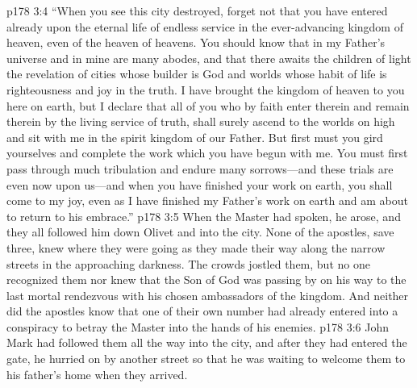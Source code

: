 \vs p178 3:4 \textcolor{ubdarkred}{“When you see this city destroyed, forget not that you have entered already upon the eternal life of endless service in the ever\hyp{}advancing kingdom of heaven, even of the heaven of heavens. You should know that in my Father’s universe and in mine are many abodes, and that there awaits the children of light the revelation of cities whose builder is God and worlds whose habit of life is righteousness and joy in the truth. I have brought the kingdom of heaven to you here on earth, but I declare that all of you who by faith enter therein and remain therein by the living service of truth, shall surely ascend to the worlds on high and sit with me in the spirit kingdom of our Father. But first must you gird yourselves and complete the work which you have begun with me. You must first pass through much tribulation and endure many sorrows---and these trials are even now upon us---and when you have finished your work on earth, you shall come to my joy, even as I have finished my Father’s work on earth and am about to return to his embrace.”}
\pc \vs p178 3:5 When the Master had spoken, he arose, and they all followed him down Olivet and into the city. None of the apostles, save three, knew where they were going as they made their way along the narrow streets in the approaching darkness. The crowds jostled them, but no one recognized them nor knew that the Son of God was passing by on his way to the last mortal rendezvous with his chosen ambassadors of the kingdom. And neither did the apostles know that one of their own number had already entered into a conspiracy to betray the Master into the hands of his enemies.
\vs p178 3:6 John Mark had followed them all the way into the city, and after they had entered the gate, he hurried on by another street so that he was waiting to welcome them to his father’s home when they arrived.

